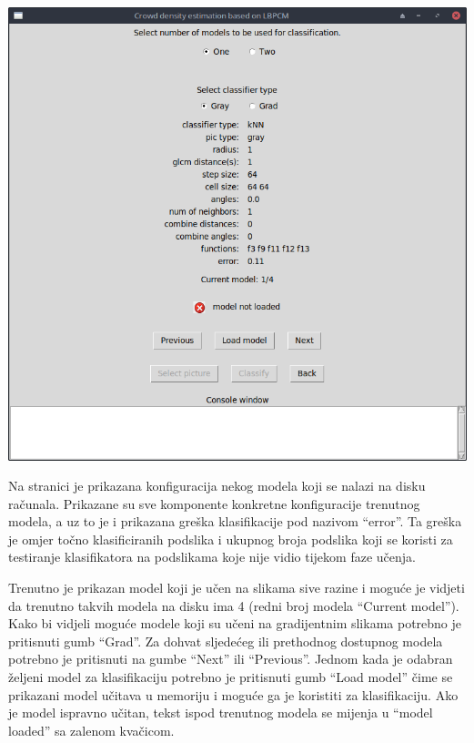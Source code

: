 \documentclass[times, utf8, zavrsni]{fer}
\begin{document}
\begin{minipage}{\linewidth}
\centering
\includegraphics[scale=0.4]{img/cl1.png}
\end{minipage}

\bigbreak 

Na stranici je prikazana konfiguracija nekog modela koji se nalazi na 
disku računala. Prikazane su sve komponente konkretne konfiguracije
trenutnog modela, a uz to je i prikazana greška klasifikacije pod
nazivom \enquote{error}. Ta greška je omjer točno klasificiranih
podslika i ukupnog broja podslika koji se koristi za testiranje klasifikatora
na podslikama koje nije vidio tijekom faze učenja. 

\bigbreak 

Trenutno je prikazan model koji je učen na slikama sive razine i moguće
je vidjeti da trenutno takvih modela na disku ima 4 (redni broj modela
\enquote{Current model}). Kako bi vidjeli moguće modele koji su učeni na
gradijentnim slikama potrebno je pritisnuti gumb \enquote{Grad}. Za dohvat
sljedećeg ili prethodnog dostupnog modela potrebno je pritisnuti na 
gumbe \enquote{Next} ili \enquote{Previous}. Jednom kada je odabran željeni
model za klasifikaciju potrebno je pritisnuti gumb \enquote{Load model} čime
se prikazani model učitava u memoriju i moguće ga je koristiti za klasifikaciju.
Ako je model ispravno učitan, tekst ispod trenutnog modela se mijenja
u \enquote{model loaded} sa zalenom kvačicom.
\end{document}
